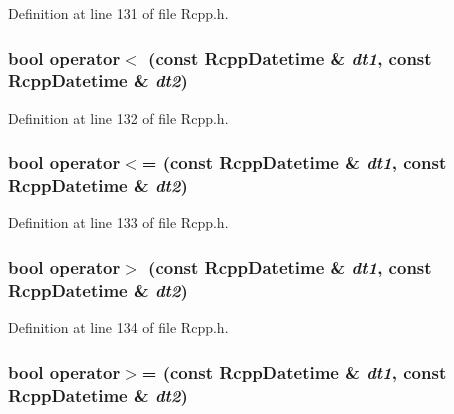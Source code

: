 Definition at line 131 of file Rcpp.h.\hypertarget{classRcppDatetime_142f9346629bf7a6f673ba05d9338cf3}{
\subsubsection[operator$<$]{\setlength{\rightskip}{0pt plus 5cm}bool operator$<$ (const {\bf RcppDatetime} \& {\em dt1}, \/  const {\bf RcppDatetime} \& {\em dt2})}}
\label{classRcppDatetime_142f9346629bf7a6f673ba05d9338cf3}




Definition at line 132 of file Rcpp.h.\hypertarget{classRcppDatetime_7d98733f95f5647ac10bb8236c1a7a8d}{
\subsubsection[operator$<$=]{\setlength{\rightskip}{0pt plus 5cm}bool operator$<$= (const {\bf RcppDatetime} \& {\em dt1}, \/  const {\bf RcppDatetime} \& {\em dt2})}}
\label{classRcppDatetime_7d98733f95f5647ac10bb8236c1a7a8d}




Definition at line 133 of file Rcpp.h.\hypertarget{classRcppDatetime_062107b2e2809a60c67f80da5dab77ed}{
\subsubsection[operator$>$]{\setlength{\rightskip}{0pt plus 5cm}bool operator$>$ (const {\bf RcppDatetime} \& {\em dt1}, \/  const {\bf RcppDatetime} \& {\em dt2})}}
\label{classRcppDatetime_062107b2e2809a60c67f80da5dab77ed}




Definition at line 134 of file Rcpp.h.\hypertarget{classRcppDatetime_1aac48969216af0555677a43b3617781}{
\subsubsection[operator$>$=]{\setlength{\rightskip}{0pt plus 5cm}bool operator$>$= (const {\bf RcppDatetime} \& {\em dt1}, \/  const {\bf RcppDatetime} \& {\em dt2})}}
\label{classRcppDatetime_1aac48969216af0555677a43b3617781}




